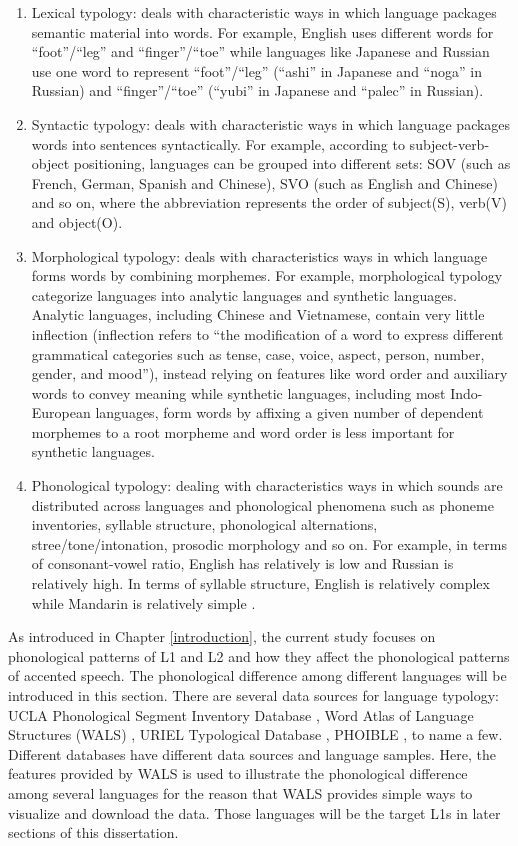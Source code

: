 \begin{enumerate}
\item Lexical typology: deals with characteristic ways in which language packages semantic material into words. For example, English uses different words for ``foot''/``leg'' and ``finger''/``toe'' while languages like Japanese and Russian use one word to represent ``foot''/``leg'' (``ashi'' in Japanese and ``noga'' in Russian) and ``finger''/``toe'' (``yubi'' in Japanese and ``palec'' in Russian).
\item Syntactic typology: deals with characteristic ways in which language packages words into sentences syntactically. For example, according to subject-verb-object positioning, languages can be grouped into different sets: SOV (such as French, German, Spanish and Chinese), SVO (such as English and Chinese) and so on, where the abbreviation represents the order of subject(S), verb(V) and object(O).
\item Morphological typology: deals with characteristics ways in which language forms words by combining morphemes. For example, morphological typology categorize languages into analytic languages and synthetic languages. Analytic languages, including Chinese and Vietnamese, contain very little inflection (inflection refers to ``the modification of a word to express different grammatical categories such as tense, case, voice, aspect, person, number, gender, and mood''), instead relying on features like word order and auxiliary words to convey meaning while synthetic languages, including most Indo-European languages, form words by affixing a given number of dependent morphemes to a root morpheme and word order is less important for synthetic languages.
\item Phonological typology: dealing with characteristics ways in which sounds are distributed across languages and phonological phenomena such as phoneme inventories, syllable structure, phonological alternations, stree/tone/intonation, prosodic morphology and so on. For example, in terms of consonant-vowel ratio, English has relatively is low and Russian is relatively high. In terms of syllable structure, English is relatively complex while Mandarin is relatively simple \citep{wals}.
\end{enumerate}

As introduced in Chapter \ref{introduction}, the current study focuses on phonological patterns of L1 and L2 and how they affect the phonological patterns of accented speech. The phonological difference among different languages will be introduced in this section. There are several data sources for language typology: UCLA Phonological Segment Inventory Database \citep{maddieson1992ucla}, Word Atlas of Language Structures (WALS) \citep{wals}, URIEL Typological Database \citep{littel2016uriel}, PHOIBLE \citep{phoible}, to name a few. Different databases have different data sources and language samples. Here, the features provided by WALS is used to illustrate the phonological difference among several languages for the reason that WALS provides simple ways to visualize and download the data. Those languages will be the target L1s in later sections of this dissertation.

